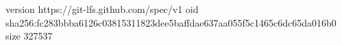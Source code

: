 version https://git-lfs.github.com/spec/v1
oid sha256:fc283bbba6126c03815311823dee5baffdae637aa055f5c1465c6dc65da016b0
size 327537
